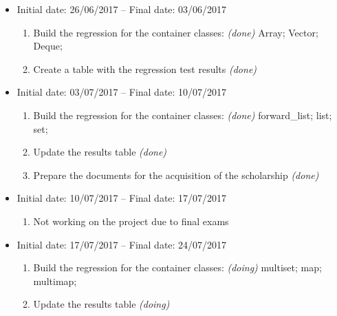 \documentclass[11pt]{article}
\begin{document}
\begin{itemize}
	\item Initial date: 26/06/2017 -- Final date: 03/06/2017
	\begin{enumerate}
		\item Build the regression for the container classes: {\it (done)}
		    \subitem Array;
		    \subitem Vector;
		    \subitem Deque;
		\item Create a table with the regression test results {\it (done)}
	\end{enumerate}
	
	\item Initial date: 03/07/2017 -- Final date: 10/07/2017
	\begin{enumerate}
		\item Build the regression for the container classes: {\it (done)}
		    \subitem forward\_list;
		    \subitem list;
		    \subitem set;
		\item Update the results table {\it (done)}
		\item Prepare the documents for the acquisition of the scholarship {\it (done)}
	\end{enumerate}
	
	\item Initial date: 10/07/2017 -- Final date: 17/07/2017
	\begin{enumerate}
		\item Not working on the project due to final exams
	\end{enumerate}
	
	\item Initial date: 17/07/2017 -- Final date: 24/07/2017
	\begin{enumerate}
		\item Build the regression for the container classes: {\it (doing)}
		    \subitem multiset;
		    \subitem map;
		    \subitem multimap;
		\item Update the results table {\it (doing)}
	\end{enumerate}
	
	
\end{itemize}
\end{document}
